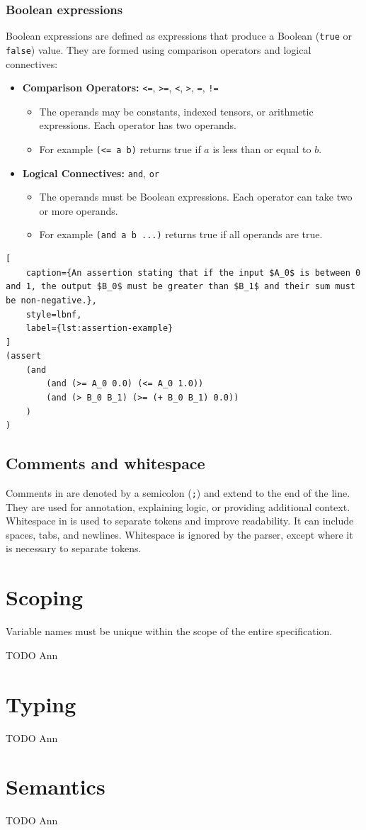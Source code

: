 \subsubsection*{Boolean expressions}
Boolean expressions are defined as expressions that produce a Boolean (\texttt{true} or \texttt{false}) value. They are formed using comparison operators and logical connectives:
\begin{itemize}
    \item \textbf{Comparison Operators:} \texttt{<=}, \texttt{>=}, \texttt{<}, \texttt{>}, \texttt{=}, \texttt{!=}
    \begin{itemize}
        \item The operands may be constants, indexed tensors, or arithmetic expressions. Each operator has two operands.
        \item For example \texttt{(<= a b)} returns true if $a$ is less than or equal to $b$.
    \end{itemize}
    \item \textbf{Logical Connectives:} \texttt{and}, \texttt{or}
    \begin{itemize}
        \item The operands must be Boolean expressions. Each operator can take two or more operands.
        \item For example \texttt{(and a b ...)} returns true if all operands are true.
    \end{itemize}
\end{itemize}

\begin{lstlisting}[
    caption={An assertion stating that if the input $A_0$ is between 0 and 1, the output $B_0$ must be greater than $B_1$ and their sum must be non-negative.},
    style=lbnf,
    label={lst:assertion-example}
]
(assert
    (and
        (and (>= A_0 0.0) (<= A_0 1.0))
        (and (> B_0 B_1) (>= (+ B_0 B_1) 0.0))
    )
)
\end{lstlisting}

\subsection{Comments and whitespace}

Comments in \vnnlib{} are denoted by a semicolon (\texttt{;}) and extend to the end of the line. They are used for annotation, explaining logic, or providing additional context. Whitespace in \vnnlib{} is used to separate tokens and improve readability. It can include spaces, tabs, and newlines. Whitespace is ignored by the parser, except where it is necessary to separate tokens.


\section{Scoping}
\label{sec:scoping}

Variable names must be unique within the scope of the entire \vnnlib{} specification.

TODO Ann

\section{Typing}
\label{sec:typing}

TODO Ann

\section{Semantics}
\label{sec:semantics}

TODO Ann
